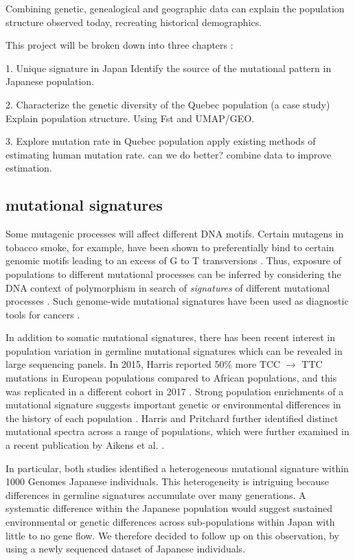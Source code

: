 \documentclass[
11pt, %
oneside, %
english, %
doublespacing, %
headsepline, %
]{MastersDoctoralThesis} %
\begin{document}
Combining genetic, genealogical and geographic data can explain the population structure observed today, recreating historical demographics.

This project will be broken down into three chapters :

1. Unique signature in Japan
Identify the source of the mutational pattern in Japanese population. 

2. Characterize the genetic diversity of the Quebec population (a case study)
Explain population structure. Using Fst and UMAP/GEO.

3. Explore mutation rate in Quebec population
apply existing methods of estimating human mutation rate.
can we do better? combine data to improve estimation. 

\subsection{mutational signatures}
Some mutagenic processes will affect different DNA motifs. 
Certain mutagens in tobacco smoke, for example, have been shown to preferentially bind to certain genomic motifs leading to an excess of G to T transversions \citep{Pfeifer2002,Pleasance2010}. 
Thus, exposure of populations to different mutational processes can be inferred by considering the DNA context of polymorphism in search of \textit{signatures} of different mutational processes \citep{Alexandrov2013,Shiraishi2015a}. 
Such genome-wide mutational signatures have been used as diagnostic tools for cancers \citep{Alexandrov2013,Shiraishi2015a}.

In addition to somatic mutational signatures, there has been recent interest in population variation in germline mutational signatures which can be revealed in large sequencing panels. 
In 2015, Harris reported 50\% more TCC ${\rightarrow}$ TTC mutations in European populations compared to African populations, and this was replicated in a different cohort in 2017 \citep{Harris2015a, Harris2017a, Mathieson2017a}. 
Strong population enrichments of a mutational signature suggests important genetic or environmental differences in the history of each population \citep{Harris2015a, Harris2017a}. 
Harris and Pritchard further identified distinct mutational spectra across a range of populations, which were further examined in a recent publication by Aikens et al. \citep{Harris2017a,Aikens2018}.
 
 In particular, both studies  identified a heterogeneous mutational signature within 1000 Genomes Japanese individuals.
This heterogeneity is intriguing because differences in germline signatures accumulate over many generations.
A systematic difference within the Japanese population would suggest sustained environmental or genetic differences across sub-populations within Japan with little to no gene flow.
We therefore decided to follow up on this observation, by using a newly sequenced dataset of Japanese individuals. 
\end{document}
